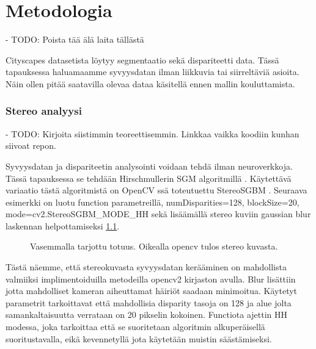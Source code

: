 \chapter{Metodologia}
\label{ch:metodologia}

- TODO: Poista tää älä laita tällästä

Cityscapes datasetista löytyy segmentaatio sekä dispariteetti data. Tässä tapauksessa haluamaamme syvyysdatan ilman liikkuvia tai siirreltäviä asioita. Näin ollen pitää saatavilla olevaa dataa käsitellä ennen mallin kouluttamista.

\subsection{Stereo analyysi}

- TODO: Kirjoita siistimmin teoreettisemmin. Linkkaa vaikka koodiin kunhan siivoat repon.

Syvyysdatan ja dispariteetin analysointi voidaan tehdä ilman neuroverkkoja.
Tässä tapauksessa se tehdään Hirschmullerin SGM algoritmillä \cite{hirschmuller2005babel}.
Käytettävä variaatio tästä algoritmistä on OpenCV ssä toteutuettu StereoSGBM \cite{opencvsgbm}.
Seuraava esimerkki on luotu function parametreillä, numDisparities=128, blockSize=20, mode=cv2.StereoSGBM\_MODE\_HH
sekä lisäämällä stereo kuviin gaussian blur laskennan helpottamiseksi \ref{fig:disparity1}.

\begin{figure}
\centering
{}
\caption[Tämä on lyhyt kuvateksti.]{Vasemmalla tarjottu totuus. Oikealla opencv tulos stereo kuvasta.}
\label{fig:disparity1}
\end{figure}
    
Tästä näemme, että stereokuvasta syvyysdatan kerääminen on mahdollista valmiiksi implimentoiduilla metodeilla opencv2 kirjaston avulla.
Blur lisättiin jotta mahdolliset kameran aiheuttamat häiriöt saadaan minimoitua.
Käytetyt parametrit tarkoittavat että mahdollisia disparity tasoja on 128 ja alue jolta samankaltaisuutta verrataan on 20 pikselin kokoinen. Functiota ajettin HH modessa, joka tarkoittaa että se suoritetaan algoritmin alkuperäisellä suoritustavalla, eikä kevennetyllä jota käytetään muistin säästämiseksi.

